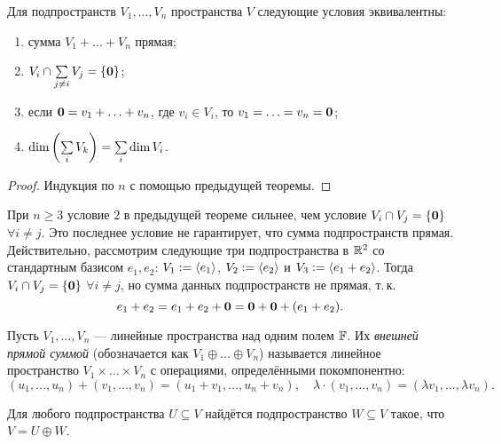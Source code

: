 \begin{theorem}
    Для подпространств $V_1, \ldots, V_n$ пространства $V$ следующие условия эквивалентны:
    \begin{enumerate}[nolistsep]
        \item сумма $V_1 + \ldots + V_n$ прямая;
        \item $V_i \cap \sum\limits_{j \ne i}V_j = \{\boldsymbol{0}\}$;
        \item если $\boldsymbol{0} = v_1 + \ldots + v_n$, где $v_i \in V_i$, то $v_1 = \ldots = v_n = \boldsymbol{0}$;
        \item $\dim\left(\sum\limits_iV_k\right) = \sum\limits_i\dim V_i$.
    \end{enumerate}
\end{theorem}

\begin{proof}
    Индукция по $n$ с помощью предыдущей теоремы.
\end{proof}

\begin{remark}
    При $n \geqslant 3$ условие $2$ в предыдущей теореме сильнее, чем условие $V_i \cap V_j = \{\boldsymbol{0}\}$ $\forall i \ne j$. Это последнее условие не гарантирует, что сумма подпространств прямая. Действительно, рассмотрим следующие три подпространства в $\mathbb{R}^2$ со стандартным базисом $e_1, e_2$: $V_1 \vcentcolon = \langle e_1\rangle$, $V_2 \vcentcolon = \langle e_2\rangle$ и $V_3 \vcentcolon = \langle e_1 + e_2\rangle$. Тогда $V_i \cap V_j = \{\boldsymbol{0}\}$ $\forall i \ne j$, но сумма данных подпространств не прямая, т.\,к. \[e_1 + e_2 = e_1 + e_2 + \boldsymbol{0} = \boldsymbol{0} + \boldsymbol{0} + (e_1 + e_2).\]
\end{remark}

\begin{definition}
    Пусть $V_1, \ldots, V_n$ --- линейные пространства над одним полем $\mathbb{F}$. Их \textit{внешней прямой суммой} (обозначается как $V_1 \oplus \ldots \oplus V_n$) называется линейное пространство $V_1 \times \ldots \times V_n$ с операциями, определёнными покомпонентно:
    \[
        (u_1, \ldots, u_n) + (v_1, \ldots, v_n) = (u_1 + v_1, \ldots, u_n + v_n),\quad \lambda \cdot (v_1, \ldots, v_n) = (\lambda v_1, \ldots, \lambda v_n).
    \]
\end{definition}

\begin{proposal}
    Для любого подпространства $U \subseteq V$ найдётся подпространство $W \subseteq V$ такое, что $V = U \oplus W$.
\end{proposal}

